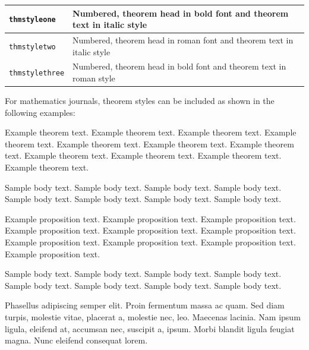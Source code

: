 \documentclass[
	a4paper, %
	10pt, %
	unnumberedsections, %
	twoside, %
]{LTJournalArticle}
\begin{document}
\bigskip
\begin{tabular}{|l|p{19pc}|}
\hline
\verb+thmstyleone+ & Numbered, theorem head in bold font and theorem text in italic style \\\hline
\verb+thmstyletwo+ & Numbered, theorem head in roman font and theorem text in italic style \\\hline
\verb+thmstylethree+ & Numbered, theorem head in bold font and theorem text in roman style \\\hline
\end{tabular}
\bigskip

For mathematics journals, theorem styles can be included as shown in the following examples:

\begin{theorem}\label{thm1}
Example theorem text. Example theorem text. Example theorem text. Example theorem text. Example theorem text. 
Example theorem text. Example theorem text. Example theorem text. Example theorem text. Example theorem text. 
Example theorem text. 
\end{theorem}

Sample body text. Sample body text. Sample body text. Sample body text. Sample body text. Sample body text. Sample body text. Sample body text.

\begin{proposition}
Example proposition text. Example proposition text. Example proposition text. Example proposition text. Example proposition text. 
Example proposition text. Example proposition text. Example proposition text. Example proposition text. Example proposition text. 
\end{proposition}

Sample body text. Sample body text. Sample body text. Sample body text. Sample body text. Sample body text. Sample body text. Sample body text.

\begin{example}
Phasellus adipiscing semper elit. Proin fermentum massa
ac quam. Sed diam turpis, molestie vitae, placerat a, molestie nec, leo. Maecenas lacinia. Nam ipsum ligula, eleifend
at, accumsan nec, suscipit a, ipsum. Morbi blandit ligula feugiat magna. Nunc eleifend consequat lorem. 
\end{example}
\end{document}
